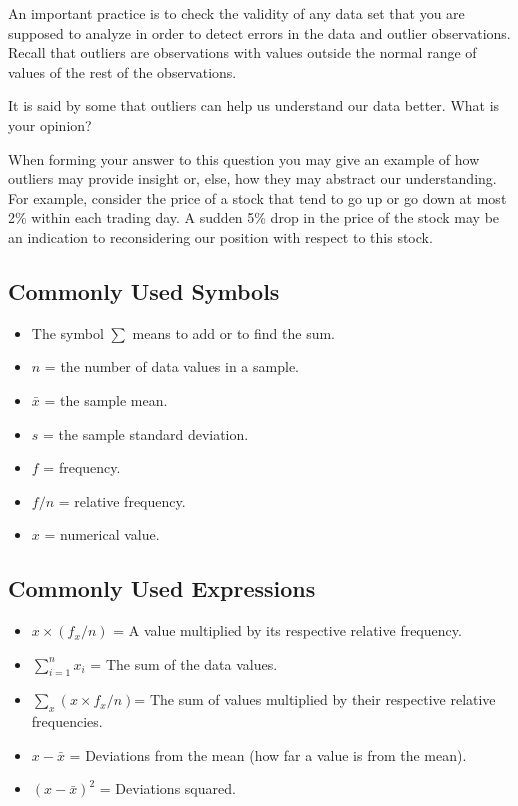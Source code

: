 \documentclass[]{krantz}
\theoremstyle{definition}
\theoremstyle{definition}
\theoremstyle{definition}
\theoremstyle{remark}
\begin{document}
An important practice is to check the validity of any data set that you
are supposed to analyze in order to detect errors in the data and
outlier observations. Recall that outliers are observations with values
outside the normal range of values of the rest of the observations.

It is said by some that outliers can help us understand our data better.
What is your opinion?

When forming your answer to this question you may give an example of how
outliers may provide insight or, else, how they may abstract our
understanding. For example, consider the price of a stock that tend to
go up or go down at most 2\% within each trading day. A sudden 5\% drop
in the price of the stock may be an indication to reconsidering our
position with respect to this stock.

\subsection*{Commonly Used Symbols}\label{commonly-used-symbols}


\begin{itemize}
\item
  The symbol \(\sum\) means to add or to find the sum.
\item
  \(n\) = the number of data values in a sample.
\item
  \(\bar x\) = the sample mean.
\item
  \(s\) = the sample standard deviation.
\item
  \(f\) = frequency.
\item
  \(f/n\) = relative frequency.
\item
  \(x\) = numerical value.
\end{itemize}

\subsection*{Commonly Used Expressions}\label{commonly-used-expressions}


\begin{itemize}
\item
  \(x \times (f_x/n)\) = A value multiplied by its respective relative
  frequency.
\item
  \(\sum_{i=1}^n x_i\) = The sum of the data values.
\item
  \(\sum_x (x \times f_x/n)\)= The sum of values multiplied by their
  respective relative frequencies.
\item
  \(x - \bar x\) = Deviations from the mean (how far a value is from the
  mean).
\item
  \((x - \bar x)^2\) = Deviations squared.
\end{itemize}
\end{document}
